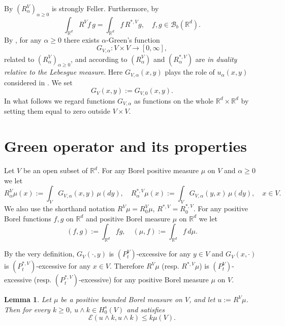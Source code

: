 \documentclass[11pt,a4paper,reqno]{amsart}
\newtheorem{lemma}[theorem]{\bf Lemma}
\theoremstyle{definition}
\numberwithin{equation}{section}
\begin{document}
By \cite[Theorem 3.4]{SW1} $(R^{V}_\alpha)_{\alpha\ge 0}$  is strongly Feller. 
Furthermore, by \cite[Theorem 3.5.7]{Oshima} 
\[
\int_{\mathbb R^d} R^{V}f\,g=\int_{\mathbb R^d} f\,R^{*,V}g,\quad f,g\in\mathscr B_b(\mathbb R^d).
\]
By \cite[Theorem VI.1.4]{BG},  for any $\alpha\ge 0$ there exists $\alpha$-Green's function 
\begin{equation}
\label{eq.gvvve}
G_{V,\alpha}:V\times V\to [0,\infty],
\end{equation}
related to  $(R^{V}_\alpha)_{\alpha\ge 0}$, and
according to \cite[Definition VI.1.2]{BG}   $(R^{V}_\alpha)$ and $(R^{*,V}_\alpha)$ 
are {\em in duality relative to the Lebesgue measure}.
Here $G_{V,\alpha}(x,y)$ plays the role of $u_\alpha(x,y)$ considered in \cite[Definition VI.1.2]{BG}.
 We set 
\[
G_{V}(x,y):=G_{V,0}(x,y).
\]
In what follows we regard functions $G_{V,\alpha}$ as functions on the whole $\mathbb R^d\times\mathbb R^d$
 by setting them equal to zero  outside $V\times V$.


\section{Green operator and its properties}
\label{sec3}
Let $V$ be an open  subset of $\mathbb R^d$. For any Borel positive measure $\mu$ on $V$ and $\alpha\ge 0$ we let
\begin{equation}
\label{dual.res2}
R^{V}_\alpha\mu(x):=\int_{V}G_{V,\alpha}(x,y)\,\mu(dy),\quad  R^{*,V}_\alpha \mu(x):=\int_{V}G_{V,\alpha}(y,x)\,\mu(dy),\quad x\in V.
\end{equation}
We also use the shorthand notation $R^{V}\mu=R^{V}_0\mu$, $R^{*,V} =R^{*,V}_0$.
For any positive Borel functions $f,g$ on $\mathbb R^d$ and positive Borel measure $\mu$ on $\mathbb R^d$ we let
\[
(f,g):=\int_{\mathbb R^d}fg,\quad (\mu,f):=\int_{\mathbb R^d}f\,d\mu.
\]

By the very definition, $G_V(\cdot,y)$ is $(P^V_t)$-excessive for any $y\in V$ and 
$G_V(x,\cdot)$ is $(P^{*,V}_t)$-excessive for any $x\in V$. Therefore $R^V\mu$ (resp. $R^{*,V}\mu$) is 
$(P^V_t)$-excessive  (resp. $(P^{*,V}_t)$-excessive) for any positive Borel measure $\mu$ on $V$. 


\begin{lemma}\label{trunc-sobolev}
Let $\mu$ be a positive bounded Borel measure on $V$, and let $u := R^V\mu$. Then for every $k\ge 0$, 
$u\wedge k\in H_0^s(V)$ and satisfies
\begin{equation}
\label{trunc-measure-bound}
\mathcal{E}(u\wedge k, u\wedge k) \le k \mu(V).
\end{equation}
\end{lemma}
\end{document}
